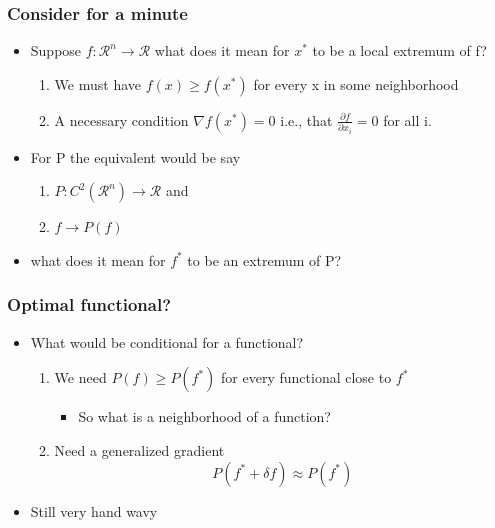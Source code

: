 \documentclass[10pt]{beamer}
\begin{document}
\begin{frame}
  \frametitle{Consider for a minute}
  \begin{itemize}
  \item Suppose $ f: \mathcal{R}^n \rightarrow \mathcal{R}$ what does it mean for $x^*$ to be a local extremum of f? \pause
    \begin{enumerate}
    \item We must have $f(x) \geq f(x^*)$ for every x in some neighborhood
    \item A necessary condition $\nabla f(x^*) = 0$ i.e., that $\frac{\partial f}{\partial x_i} = 0$ for all i. 
    \end{enumerate}
  \item For P the equivalent would be say
    \begin{enumerate}
    \item $P: C^2(\mathcal{R}^n) \rightarrow \mathcal{R}$ and
    \item $f \rightarrow P(f)$
    \end{enumerate}
  \item what does it mean for $f^*$ to be an extremum of P?
  \end{itemize}
\end{frame}

\begin{frame}
  \frametitle{Optimal functional? }
  \begin{itemize}
  \item What would be conditional for a functional?
    \begin{enumerate}
    \item We need $P(f) \geq P(f^*)$ for every functional close to $f^*$
      \begin{itemize}
      \item So what is a neighborhood of a function?
      \end{itemize}
    \item Need a generalized gradient
      \[
        P( f^* + \delta f ) \approx P(f^*)
      \]
    \end{enumerate}
  \item Still very hand wavy
  \end{itemize}
\end{frame}
\end{document}
